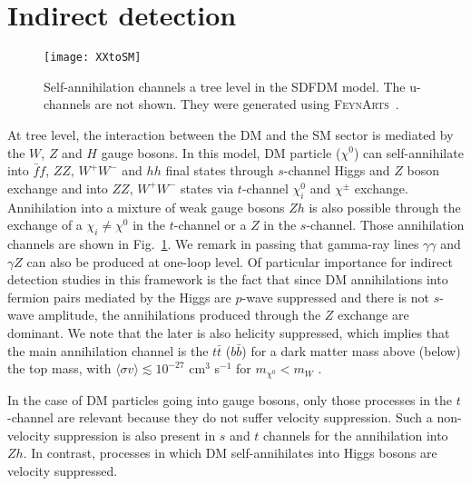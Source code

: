 \section{Indirect detection }
\label{sec:indirec-detection}


\begin{figure}
\begin{center}
\texttt{[image: XXtoSM]}
\end{center}
\caption{Self-annihilation channels a tree level in the SDFDM model. The u-channels are not shown. They were generated using \textsc{FeynArts}~\cite{Hahn:2000kx}.}
\label{fig:self-channels}
\end{figure}

At tree level, the interaction between the DM and the SM sector is mediated by the $W$, $Z$ and $H$ gauge bosons.
In this model, DM particle ($\chi^0$) can self-annihilate into $\bar{f}f$, $ZZ$, $W^+W^-$ and $hh$ final states through  $s$-channel Higgs and $Z$ boson exchange and into $ZZ$, $W^+W^-$ states via $t$-channel $\chi_i^0$ and $\chi^{\pm}$ exchange. Annihilation into a mixture of weak gauge bosons $Zh$ is also possible through the exchange of a $\chi_i\neq\chi^0$  in the $t$-channel or a $Z$ in the $s$-channel. Those annihilation channels are shown in Fig.~\ref{fig:self-channels}.  We remark in passing that gamma-ray lines $\gamma\gamma$ and $\gamma Z$ can also be produced at one-loop level.
Of particular importance for indirect detection studies in this framework is the fact that since DM annihilations into fermion pairs mediated by the Higgs are $p$-wave suppressed and there is not $s$-wave amplitude, the annihilations produced through the $Z$ exchange are dominant. We note that the later is also helicity suppressed, which implies that the main annihilation channel is the $t\bar{t}$ ($b\bar{b}$) for a dark matter mass above (below) the top mass, with $\langle\sigma v \rangle\lesssim 10^{-27}$ cm$^3$ s$^{-1}$ for $m_{\chi^0}<m_W$ \cite{Calibbi:2015nha}. 

In the case of DM particles going into gauge bosons, only those processes in the $t$-channel are relevant because they do not suffer velocity suppression. Such a non-velocity suppression is also present in $s$ and $t$ channels for the annihilation into $Zh$. 
In contrast, processes in which DM self-annihilates into Higgs bosons are velocity suppressed. 










